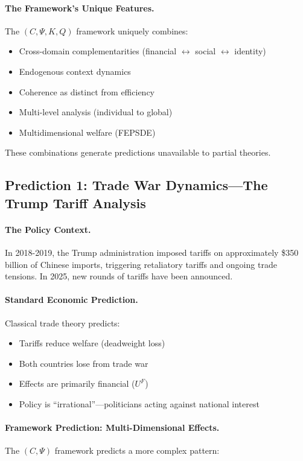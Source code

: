 \documentclass[12pt,a4paper]{article}
\begin{document}
\paragraph{The Framework's Unique Features.}
The $(C, \Psi, K, Q)$ framework uniquely combines:
\begin{itemize}
  \item Cross-domain complementarities (financial $\leftrightarrow$ social $\leftrightarrow$ identity)
  \item Endogenous context dynamics
  \item Coherence as distinct from efficiency
  \item Multi-level analysis (individual to global)
  \item Multidimensional welfare (FEPSDE)
\end{itemize}

These combinations generate predictions unavailable to partial theories.

\subsection{Prediction 1: Trade War Dynamics---The Trump Tariff Analysis}

\paragraph{The Policy Context.}
In 2018-2019, the Trump administration imposed tariffs on approximately
\$350 billion of Chinese imports, triggering retaliatory tariffs
and ongoing trade tensions. In 2025, new rounds of tariffs have been announced.

\paragraph{Standard Economic Prediction.}
Classical trade theory predicts:
\begin{itemize}
  \item Tariffs reduce welfare (deadweight loss)
  \item Both countries lose from trade war
  \item Effects are primarily financial ($U^F$)
  \item Policy is ``irrational''---politicians acting against national interest
\end{itemize}

\paragraph{Framework Prediction: Multi-Dimensional Effects.}
The $(C, \Psi)$ framework predicts a more complex pattern:
\end{document}
